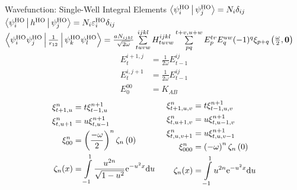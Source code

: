 \documentclass[10pt, t]{beamer}
\begin{document}
\begin{frame}[fragile]{Wavefunction: Single-Well Integral Elements}
    \centering\footnotesize
    $\Braket{\psiHO_i|\psiHO_j} = N_i \delta_{ij}$ \\
    $\Braket{\psiHO_i|h^{\text{HO}}|\psiHO_j} =
    N_i\varepsilon^{\text{HO}}_i\delta_{ij}$ \\
    $\Braket{\psiHO_i\psiHO_j|\frac{1}{r_{12}}|\psiHO_k\psiHO_l} =
    \frac{aN_{ijkl}}{\sqrt{2\omega}}  \sum\limits^{ijkl}_{tuvw} H^{ijkl}_{tuvw}
    \suml{pq}{t+v,u+w} E^{tv}_pE^{uw}_q (-1)^q\xi_{p+q}\left(\frac{\omega}{2},
    \blds{0}\right)$
        \begin{equation*}
            \begin{aligned}
                E^{i+1,j}_t &= \frac{1}{2\omega}E^{ij}_{t-1} \\
                E^{i,j+1}_t &= \frac{1}{2\omega}E^{ij}_{t-1} \\
                E^{00}_0 &= K_{AB}
            \end{aligned}
        \end{equation*}
        \begin{equation*}
            \begin{aligned}
                \xi^n_{t+1,u} &= t\xi^{n+1}_{t-1,u} \\
                \xi^n_{t,u+1} &= u\xi^{n+1}_{t,u-1} \\
                \xi^n_{00} &= \left(\frac{-\omega}{2}\right)^n
                \zeta_n\left(0\right) \\
                \zeta_n(x) &= \int\limits^1_{-1} \frac{u^{2n}}{\sqrt{1 -
                u^2}} \me^{-u^2x} \md u
            \end{aligned} \hspace{0.5cm}
            \begin{aligned}
                \xi^n_{t+1,u,v} &= t\xi^{n+1}_{t-1,u,v} \\
                \xi^n_{t,u+1,v} &= u\xi^{n+1}_{t,u-1,v} \\
                \xi^n_{t,u,v+1} &= u\xi^{n+1}_{t,u,v-1} \\
                \xi^n_{000} &= \left(-\omega\right)^n \zeta_n\left(0\right) \\
                \zeta_n(x) &= \int\limits^1_{-1} u^{2n} \me^{-u^2x} \md u
            \end{aligned}
        \end{equation*}
\end{frame}
\end{document}
